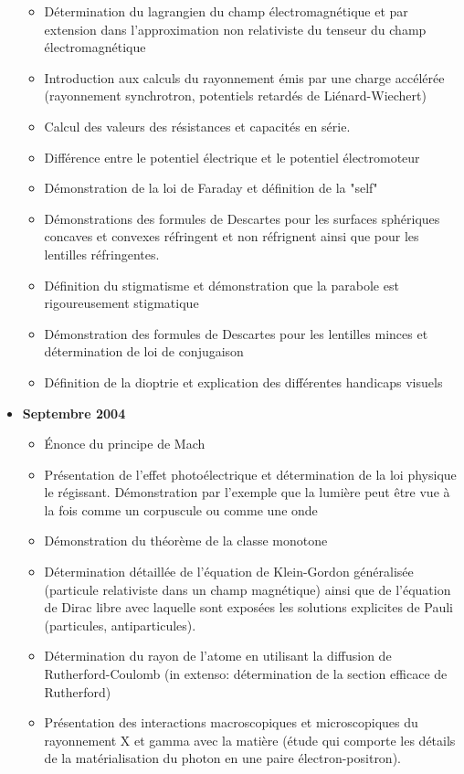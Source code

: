 \begin{itemize}
\begin{itemize}[noitemsep]
				\item Détermination du lagrangien du champ électromagnétique et par extension dans l'approximation non relativiste du tenseur du champ électromagnétique
				\item Introduction aux calculs du rayonnement émis par une charge accélérée (rayonnement synchrotron, potentiels retardés de Liénard-Wiechert)
				\item Calcul des valeurs des résistances et capacités en série. 
				\item Différence entre le potentiel électrique et le potentiel électromoteur
				\item Démonstration de la loi de Faraday et définition de la "self"
				\item Démonstrations des formules de Descartes pour les surfaces sphériques concaves et convexes réfringent et non réfrignent ainsi que pour les lentilles réfringentes. 
				\item Définition du stigmatisme et démonstration que la parabole est rigoureusement stigmatique
				\item Démonstration des formules de Descartes pour les lentilles minces et détermination de loi de conjugaison
				\item Définition de la dioptrie et explication des différentes handicaps visuels
			\end{itemize}
		\item \textbf{Septembre 2004}
			\begin{itemize}[noitemsep]
				\item Énonce du principe de Mach
				\item Présentation de l'effet photoélectrique et détermination de la loi physique le régissant. Démonstration par l'exemple que la lumière peut être vue à la fois comme un corpuscule ou comme une onde
				\item Démonstration du théorème de la classe monotone
				\item Détermination détaillée de l'équation de Klein-Gordon généralisée (particule relativiste dans un champ magnétique) ainsi que de l'équation de Dirac libre avec laquelle sont exposées les solutions explicites de Pauli (particules, antiparticules). 
				\item Détermination du rayon de l'atome en utilisant la diffusion de Rutherford-Coulomb (in extenso: détermination de la section efficace de Rutherford)
				\item Présentation des interactions macroscopiques et microscopiques du rayonnement X et gamma avec la matière (étude qui comporte les détails de la matérialisation du photon en une paire électron-positron). 

\end{itemize}
\end{itemize}
